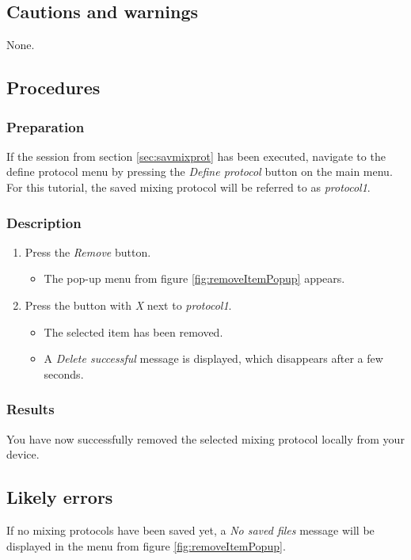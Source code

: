 \subsection{Cautions and warnings}
None.

\subsection{Procedures}

\subsubsection{Preparation}
If the session from section \ref{sec:savmixprot} has been executed, navigate to the define protocol menu by pressing the \emph{Define protocol} button on the main menu.
For this tutorial, the saved mixing protocol will be referred to as \emph{protocol1}.

\subsubsection{Description}
\begin{enumerate}
	\item Press the \emph{Remove} button.
		\begin{itemize}
			\item The pop-up menu from figure \ref{fig:removeItemPopup} appears.
		\end{itemize}
	\item Press the button with \emph{X} next to \emph{protocol1}.
		\begin{itemize}
			\item The selected item has been removed.
			\item A \emph{Delete successful} message is displayed, which disappears after a few seconds.
		\end{itemize}
\end{enumerate}

\subsubsection{Results}
You have now successfully removed the selected mixing protocol locally from your device.

\subsection{Likely errors}
If no mixing protocols have been saved yet, a \emph{No saved files} message will be displayed in the menu from figure \ref{fig:removeItemPopup}.

